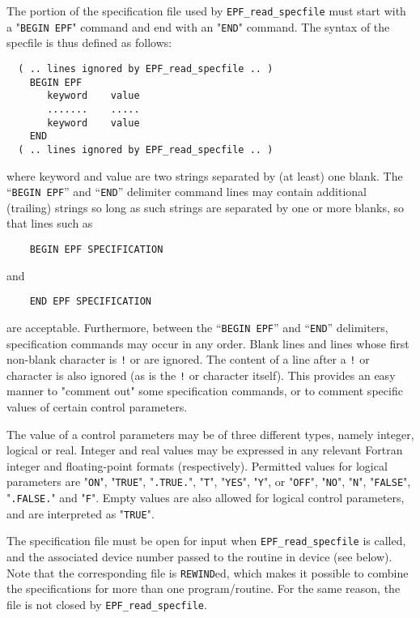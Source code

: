 \documentclass{galahad}
\newcommand{\packagename}{EPF}
\begin{document}
The portion of the specification file used by
{\tt \packagename\_read\_specfile}
must start
with a "{\tt BEGIN \packagename}" command and end with an
"{\tt END}" command.  The syntax of the specfile is thus defined as follows:
\begin{verbatim}
  ( .. lines ignored by EPF_read_specfile .. )
    BEGIN EPF
       keyword    value
       .......    .....
       keyword    value
    END
  ( .. lines ignored by EPF_read_specfile .. )
\end{verbatim}
where keyword and value are two strings separated by (at least) one blank.
The ``{\tt BEGIN \packagename}'' and ``{\tt END}'' delimiter command lines
may contain additional (trailing) strings so long as such strings are
separated by one or more blanks, so that lines such as
\begin{verbatim}
    BEGIN EPF SPECIFICATION
\end{verbatim}
and
\begin{verbatim}
    END EPF SPECIFICATION
\end{verbatim}
are acceptable. Furthermore,
between the
``{\tt BEGIN \packagename}'' and ``{\tt END}'' delimiters,
specification commands may occur in any order.  Blank lines and
lines whose first non-blank character is {\tt !} or {\tt *} are ignored.
The content
of a line after a {\tt !} or {\tt *} character is also
ignored (as is the {\tt !} or {\tt *}
character itself). This provides an easy manner to "comment out" some
specification commands, or to comment specific values
of certain control parameters.

The value of a control parameters may be of three different types, namely
integer, logical or real.
Integer and real values may be expressed in any relevant Fortran integer and
floating-point formats (respectively). Permitted values for logical
parameters are "{\tt ON}", "{\tt TRUE}", "{\tt .TRUE.}", "{\tt T}",
"{\tt YES}", "{\tt Y}", or "{\tt OFF}", "{\tt NO}",
"{\tt N}", "{\tt FALSE}", "{\tt .FALSE.}" and "{\tt F}".
Empty values are also allowed for
logical control parameters, and are interpreted as "{\tt TRUE}".

The specification file must be open for
input when {\tt \packagename\_read\_specfile}
is called, and the associated device number
passed to the routine in device (see below).
Note that the corresponding
file is {\tt REWIND}ed, which makes it possible to combine the specifications
for more than one program/routine.  For the same reason, the file is not
closed by {\tt \packagename\_read\_specfile}.
\end{document}
